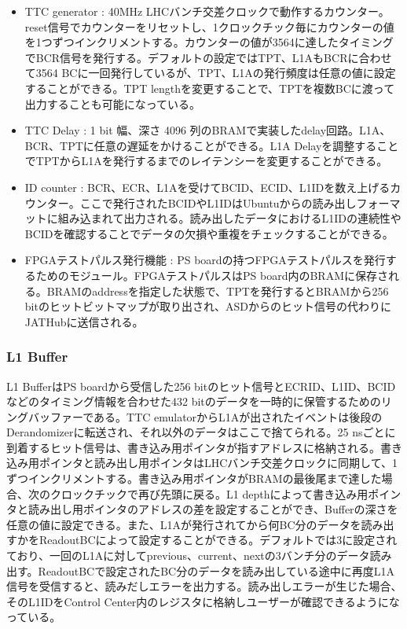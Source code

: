 \begin{itemize}
    \item {TTC generator : } 40MHz LHCバンチ交差クロックで動作するカウンター。reset信号でカウンターをリセットし、1クロックチック毎にカウンターの値を1つずつインクリメントする。カウンターの値が3564に達したタイミングでBCR信号を発行する。デフォルトの設定ではTPT、L1AもBCRに合わせて3564 BCに一回発行しているが、TPT、L1Aの発行頻度は任意の値に設定することができる。TPT lengthを変更することで、TPTを複数BCに渡って出力することも可能になっている。
    \baselineskip

    \item{TTC Delay : }1 bit 幅、深さ 4096 列のBRAMで実装したdelay回路。L1A、BCR、TPTに任意の遅延をかけることができる。L1A Delayを調整することでTPTからL1Aを発行するまでのレイテンシーを変更することができる。
    \baselineskip

    \item{ID counter : }BCR、ECR、L1Aを受けてBCID、ECID、L1IDを数え上げるカウンター。ここで発行されたBCIDやL1IDはUbuntuからの読み出しフォーマットに組み込まれて出力される。読み出したデータにおけるL1IDの連続性やBCIDを確認することでデータの欠損や重複をチェックすることができる。
    \baselineskip
    
    \item{FPGAテストパルス発行機能 : }PS boardの持つFPGAテストパルスを発行するためのモジュール。FPGAテストパルスはPS board内のBRAMに保存される。BRAMのaddressを指定した状態で、TPTを発行するとBRAMから256 bitのヒットビットマップが取り出され、ASDからのヒット信号の代わりにJATHubに送信される。
    \baselineskip
\end{itemize}

\subsubsection{L1 Buffer} \par
L1 BufferはPS boardから受信した256 bitのヒット信号とECRID、L1ID、BCIDなどのタイミング情報を合わせた432 bitのデータを一時的に保管するためのリングバッファーである。TTC emulatorからL1Aが出されたイベントは後段のDerandomizerに転送され、それ以外のデータはここで捨てられる。25 nsごとに到着するヒット信号は、書き込み用ポインタが指すアドレスに格納される。書き込み用ポインタと読み出し用ポインタはLHCバンチ交差クロックに同期して、1ずつインクリメントする。書き込み用ポインタがBRAMの最後尾まで達した場合、次のクロックチックで再び先頭に戻る。L1 depthによって書き込み用ポインタと読み出し用ポインタのアドレスの差を設定することができ、Bufferの深さを任意の値に設定できる。また、L1Aが発行されてから何BC分のデータを読み出すかをReadoutBCによって設定することができる。デフォルトでは3に設定されており、一回のL1Aに対してprevious、current、nextの3バンチ分のデータ読み出す。ReadoutBCで設定されたBC分のデータを読み出している途中に再度L1A信号を受信すると、読みだしエラーを出力する。読み出しエラーが生じた場合、そのL1IDをControl Center内のレジスタに格納しユーザーが確認できるようになっている。
\baselineskip

